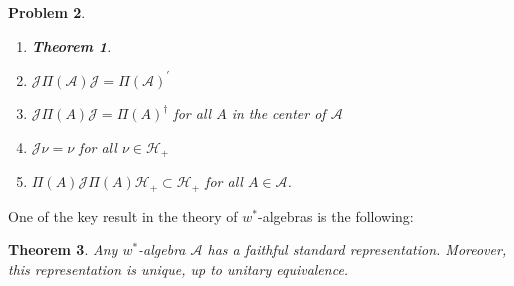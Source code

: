 \documentclass[aps,preprint]{revtex4}%
\newtheorem{theorem}{Theorem}
\newtheorem{problem}[theorem]{Problem}
\begin{document}
\begin{problem}
\begin{enumerate}
\item
\begin{theorem}

\end{theorem}

\item $\mathcal{J}\Pi(\mathcal{A})\mathcal{J}=\Pi(\mathcal{A})^{\prime}$

\item $\mathcal{J}\Pi(A)\mathcal{J}=\Pi(A)^{\dagger}$ for all $A$ in the
center of $\mathcal{A}$

\item $\mathcal{J}\nu=\nu$ for all $\nu\in\mathcal{H}_{+}$

\item $\Pi(A)\mathcal{J}\Pi(A)\mathcal{H}_{+}\subset\mathcal{H}_{+}$ for all
$A\in\mathcal{A}$.
\end{enumerate}
\end{problem}

One of the key result in the theory of $w^{\ast}$-algebras is the following:

\begin{theorem}
\emph{Any} $w^{\ast}$-algebra $\mathcal{A}$ has a faithful standard
representation. Moreover, this representation is unique, up to unitary equivalence.
\end{theorem}
\end{document}
